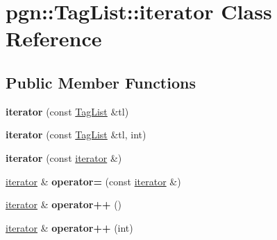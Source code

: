 \hypertarget{classpgn_1_1TagList_1_1iterator}{
\section{pgn::TagList::iterator Class Reference}
\label{classpgn_1_1TagList_1_1iterator}
}
\subsection*{Public Member Functions}
\begin{DoxyCompactItemize}
\item 
\hypertarget{classpgn_1_1TagList_1_1iterator_a01f4186540355b25789385a9b3589021}{
{\bfseries iterator} (const \hyperlink{classpgn_1_1TagList}{TagList} \&tl)}
\label{classpgn_1_1TagList_1_1iterator_a01f4186540355b25789385a9b3589021}

\item 
\hypertarget{classpgn_1_1TagList_1_1iterator_a338f14cfdab089e4c4ec62b417d13ff9}{
{\bfseries iterator} (const \hyperlink{classpgn_1_1TagList}{TagList} \&tl, int)}
\label{classpgn_1_1TagList_1_1iterator_a338f14cfdab089e4c4ec62b417d13ff9}

\item 
\hypertarget{classpgn_1_1TagList_1_1iterator_a5e4bd608535b51f119d338b6eecc603d}{
{\bfseries iterator} (const \hyperlink{classpgn_1_1TagList_1_1iterator}{iterator} \&)}
\label{classpgn_1_1TagList_1_1iterator_a5e4bd608535b51f119d338b6eecc603d}

\item 
\hypertarget{classpgn_1_1TagList_1_1iterator_ad12529a9935ddda19be039e870b9093d}{
\hyperlink{classpgn_1_1TagList_1_1iterator}{iterator} \& {\bfseries operator=} (const \hyperlink{classpgn_1_1TagList_1_1iterator}{iterator} \&)}
\label{classpgn_1_1TagList_1_1iterator_ad12529a9935ddda19be039e870b9093d}

\item 
\hypertarget{classpgn_1_1TagList_1_1iterator_a2671cbe94f0cfc8d377acfa21a8d378f}{
\hyperlink{classpgn_1_1TagList_1_1iterator}{iterator} \& {\bfseries operator++} ()}
\label{classpgn_1_1TagList_1_1iterator_a2671cbe94f0cfc8d377acfa21a8d378f}

\item 
\hypertarget{classpgn_1_1TagList_1_1iterator_a8611f33610533dde89fcefeb630902b5}{
\hyperlink{classpgn_1_1TagList_1_1iterator}{iterator} \& {\bfseries operator++} (int)}
\label{classpgn_1_1TagList_1_1iterator_a8611f33610533dde89fcefeb630902b5}


\end{DoxyCompactItemize}
